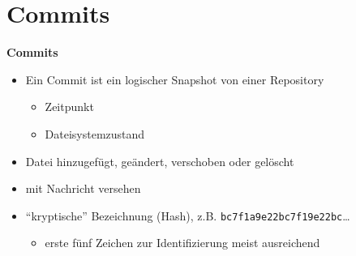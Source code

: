 \section{Commits}\label{sec:commits}

\begin{frame}[b]
    \begin{center}
    \end{center}
    \vfill
    \begin{flushleft}
        \Huge
        \textbf{Commits}
    \end{flushleft}
\end{frame}

\begin{frame}
    \slidehead
    \begin{itemize}
        \item Ein Commit ist ein logischer Snapshot von einer Repository
        \begin{itemize}
            \item Zeitpunkt
            \item Dateisystemzustand
        \end{itemize}
        \item Datei hinzugefügt, geändert, verschoben oder gelöscht
        \item mit Nachricht versehen
        \item \enquote{kryptische} Bezeichnung (Hash), z.B. \texttt{bc7f1a9e22bc7f19e22bc}\dots
        \begin{itemize}
            \item erste fünf Zeichen zur Identifizierung meist ausreichend
        \end{itemize}
    \end{itemize}
\end{frame}

